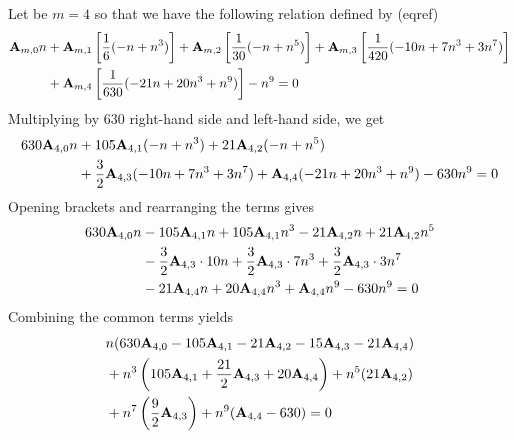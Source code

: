 \begin{examp}
    Let be $m=4$ so that we have the following relation defined by (eqref)
    \begin{equation*}
        \begin{split}
            {\mathbf{A}} \sb{m,0} n
            &+ {\mathbf{A}} \sb{m,1} \left[ \frac{1}{6} (-n + n^3) \right]
            + {\mathbf{A}} \sb{m,2} \left[ \frac{1}{30} (-n + n^5) \right]
            + {\mathbf{A}} \sb{m,3} \left[ \frac{1}{420} (-10 n + 7 n^3 + 3 n^7) \right] \\
            &+ {\mathbf{A}} \sb{m,4} \left[ \frac{1}{630} (-21 n + 20 n^3 + n^9) \right] - n^9 = 0
        \end{split}
    \end{equation*}
    Multiplying by $630$ right-hand side and left-hand side, we get
    \begin{equation*}
        \begin{split}
            630 {\mathbf{A}} \sb{4,0} n
            &+ 105 {\mathbf{A}} \sb{4,1} (-n + n^3) + 21 {\mathbf{A}} \sb{4,2} (-n + n^5) \\
            &+ \frac{3}{2} {\mathbf{A}} \sb{4,3} (-10 n + 7 n^3 + 3 n^7) + {\mathbf{A}} \sb{4,4} (-21 n + 20 n^3 + n^9) - 630 n^9 = 0
        \end{split}
    \end{equation*}
    Opening brackets and rearranging the terms gives
    \begin{equation*}
        \begin{split}
            630 {\mathbf{A}} \sb{4,0} n
            &- 105 {\mathbf{A}} \sb{4,1} n + 105 {\mathbf{A}} \sb{4,1} n ^3 - 21 {\mathbf{A}} \sb{4,2} n + 21 {\mathbf{A}} \sb{4,2} n^5 \\
            &- \frac{3}{2} {\mathbf{A}} \sb{4,3} \cdot 10n + \frac{3}{2} {\mathbf{A}} \sb{4,3} \cdot 7n^3 + \frac{3}{2} {\mathbf{A}} \sb{4,3} \cdot 3n^7 \\
            &-21 {\mathbf{A}} \sb{4,4} n + 20 {\mathbf{A}} \sb{4,4} n^3 + {\mathbf{A}} \sb{4,4} n ^9 - 630 n^9 = 0
        \end{split}
    \end{equation*}
    Combining the common terms yields
    \begin{equation*}
        \begin{split}
            &n (630 \coeffA{4}{0} - 105 \coeffA{4}{1} - 21 \coeffA{4}{2} - 15 \coeffA{4}{3} - 21 \coeffA{4}{4})  \\
            &+ n^3 \left( 105 \coeffA{4}{1} + \frac{21}{2} \coeffA{4}{3} + 20 \coeffA{4}{4} \right) + n^5 (21 \coeffA{4}{2}) \\
            &+ n^7 \left( \frac{9}{2} \coeffA{4}{3} \right) + n^9 (\coeffA{4}{4} - 630) = 0

\end{split}
\end{equation*}
\end{examp}
